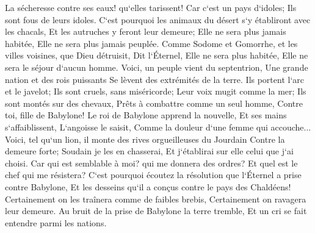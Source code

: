 \verse La sécheresse contre ses eaux! qu`elles tarissent! Car c`est un pays d`idoles; Ils sont fous de leurs idoles. 
\verse C`est pourquoi les animaux du désert s`y établiront avec les chacals, Et les autruches y feront leur demeure; Elle ne sera plus jamais habitée, Elle ne sera plus jamais peuplée. 
\verse Comme Sodome et Gomorrhe, et les villes voisines, que Dieu détruisit, Dit l`Éternel, Elle ne sera plus habitée, Elle ne sera le séjour d`aucun homme. 
\verse Voici, un peuple vient du septentrion, Une grande nation et des rois puissants Se lèvent des extrémités de la terre. 
\verse Ils portent l`arc et le javelot; Ils sont cruels, sans miséricorde; Leur voix mugit comme la mer; Ils sont montés sur des chevaux, Prêts à combattre comme un seul homme, Contre toi, fille de Babylone! 
\verse Le roi de Babylone apprend la nouvelle, Et ses mains s`affaiblissent, L`angoisse le saisit, Comme la douleur d`une femme qui accouche... 
\verse Voici, tel qu`un lion, il monte des rives orgueilleuses du Jourdain Contre la demeure forte; Soudain je les en chasserai, Et j`établirai sur elle celui que j`ai choisi. Car qui est semblable à moi? qui me donnera des ordres? Et quel est le chef qui me résistera? 
\verse C`est pourquoi écoutez la résolution que l`Éternel a prise contre Babylone, Et les desseins qu`il a conçus contre le pays des Chaldéens! Certainement on les traînera comme de faibles brebis, Certainement on ravagera leur demeure. 
\verse Au bruit de la prise de Babylone la terre tremble, Et un cri se fait entendre parmi les nations. 

